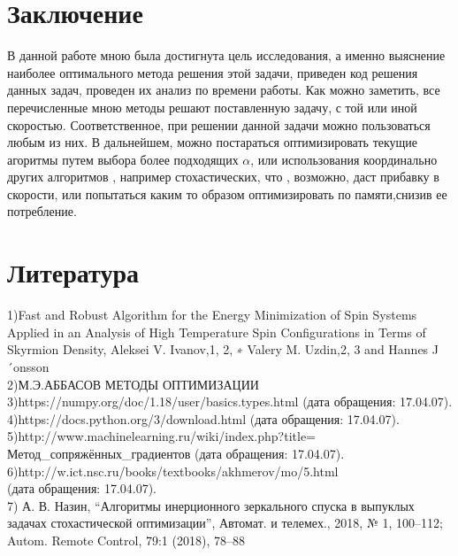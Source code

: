 \documentclass[ 12pt,x11names]{article}
\begin{document}
    \section{Заключение}
    В данной работе мною была достигнута цель исследования, а именно выяснение наиболее оптимального метода решения этой задачи, приведен  код решения данных задач, проведен их анализ по времени работы.
    Как можно заметить, все перечисленные мною методы решают поставленную задачу, с той или иной скоростью. Соответственное, при решении данной задачи можно пользоваться любым из них.
    В дальнейшем, можно постараться оптимизировать текущие агоритмы  путем выбора более подходящих $\alpha$, или использования координально других алгоритмов , например стохастических, что , возможно, даст прибавку в скорости, или попытаться каким то образом оптимизировать по памяти,снизив ее потребление.
\newpage
\section{Литература}
1)Fast and Robust Algorithm for the Energy Minimization of Spin Systems Applied in
an Analysis of High Temperature Spin Configurations in Terms of Skyrmion Density, Aleksei V. Ivanov,1, 2, ∗ Valery M. Uzdin,2, 3 and Hannes J´onsson\\
2)М.Э.АББАСОВ
МЕТОДЫ ОПТИМИЗАЦИИ\\
3)https://numpy.org/doc/1.18/user/basics.types.html (дата обращения: 17.04.07).\\
4)https://docs.python.org/3/download.html (дата обращения: 17.04.07).\\
5)http://www.machinelearning.ru/wiki/index.php?title=\\
Метод\_сопряжённых\_градиентов (дата обращения: 17.04.07).\\
6)http://w.ict.nsc.ru/books/textbooks/akhmerov/mo/5.html\\
(дата обращения: 17.04.07).\\
7)  А. В. Назин, “Алгоритмы инерционного зеркального спуска в выпуклых задачах стохастической оптимизации”, Автомат. и телемех., 2018, № 1, 100–112; Autom. Remote Control, 79:1 (2018), 78–88
\end{document}
